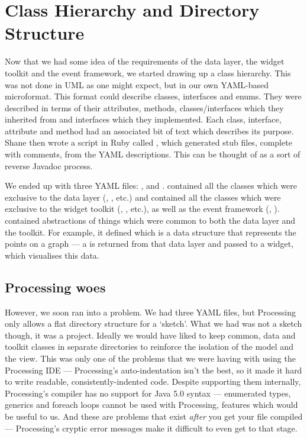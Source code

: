 \section{Class Hierarchy and Directory Structure}
Now that we had some idea of the requirements of the data layer, the widget toolkit and the event framework, we started drawing up a class hierarchy. This was not done in UML as one might expect, but in our own YAML-based microformat\cite{yaml}. This format could describe classes, interfaces and enums. They were described in terms of their attributes, methods, classes/interfaces which they inherited from and interfaces which they implemented. Each class, interface, attribute and method had an associated bit of text which describes its purpose. Shane then wrote a script in Ruby called \cite{stubs}, which generated stub  files, complete with comments, from the YAML descriptions. This can be thought of as a sort of reverse Javadoc process.

We ended up with three YAML files: ,  and .  contained all the classes which were exclusive to the data layer (, , etc.) and  contained all the classes which were exclusive to the widget toolkit (, , etc.), as well as the event framework (, ).  contained abstractions of things which were common to both the data layer and the toolkit. For example, it defined  which is a data structure that represents the points on a graph --- a  is returned from that data layer and passed to a  widget, which visualises this data.

\subsection{Processing woes}
However, we soon ran into a problem. We had three YAML files, but Processing only allows a flat directory structure for a `sketch'. What we had was not a sketch though, it was a project. Ideally we would have liked to keep common, data and toolkit classes in separate directories to reinforce the isolation of the model and the view. This was only one of the problems that we were having with using the Processing IDE --- Processing's auto-indentation isn't the best, so it made it hard to write readable, consistently-indented code. Despite supporting them internally, Processing's compiler has no support for Java 5.0 syntax --- enumerated types, generics and foreach loops cannot be used with Processing, features which would be useful to us. And these are problems that exist \emph{after} you get your  file compiled --- Processing's cryptic error messages make it difficult to even get to that stage.

